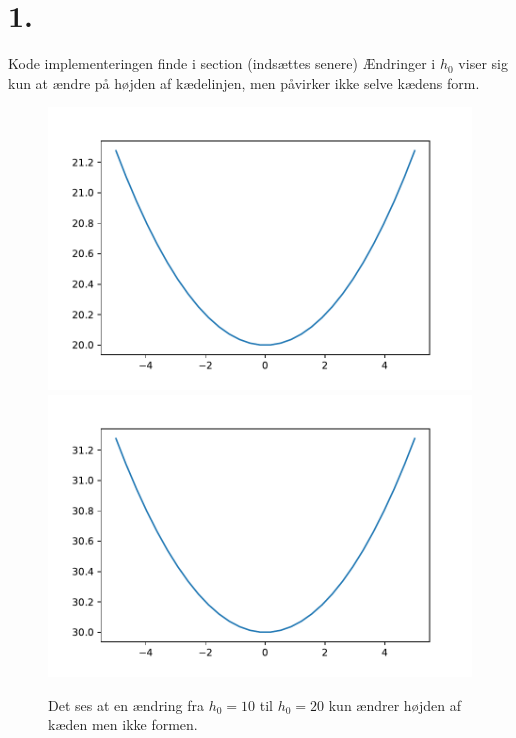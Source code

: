 \section*{1.}
Kode implementeringen finde i section (indsættes senere)
% 
Ændringer i $h_0$ viser sig kun at ændre på højden af kædelinjen, men påvirker ikke selve kædens form.
%
\begin{figure}[h!]
\includegraphics[scale=0.5]{code/fig1}
\includegraphics[scale=0.5]{code/fig2}
\caption{Det ses at en ændring fra $h_0=10$ til $h_0=20$ kun ændrer højden af kæden men ikke formen.}
\end{figure}
%
